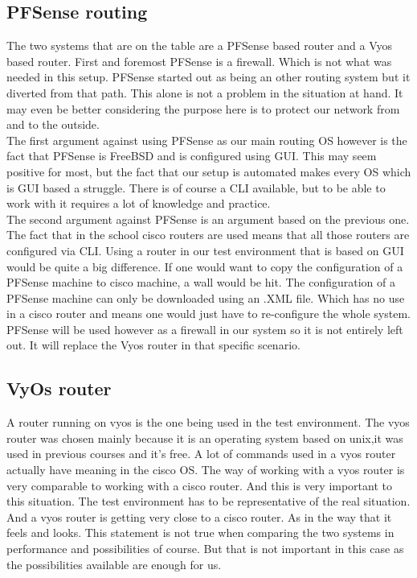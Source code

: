 \subsection { PFSense routing }
The two systems that are on the table are a PFSense based router and a Vyos based router. First and foremost PFSense is a firewall. Which is not what was needed in this setup. PFSense started out as being an other routing system but it diverted from that path. This alone is not a problem in the situation at hand. It may even be better considering the purpose here is to protect our network from and to the outside. \\
The first argument against using PFSense as our main routing OS however is the fact that PFSense is FreeBSD and is configured using GUI. This may seem positive for most, but the fact that our setup is automated makes every OS which is GUI based a struggle. There is of course a CLI available, but to be able to work with it requires a lot of knowledge and practice. \\
The second argument against PFSense is an argument based on the previous one. The fact that in the school cisco routers are used means that all those routers are configured via CLI. Using a router in our test environment that is based on GUI would be quite a big difference. If one would want to copy the configuration of a PFSense machine to cisco machine, a wall would be hit. The configuration of a PFSense machine can only be downloaded using an .XML file. Which has no use in a cisco router and means one would just have to re-configure the whole system. PFSense will be used however as a firewall in our system so it is not entirely left out. It will replace the Vyos router in that specific scenario.
\subsection { VyOs router }
A router running on vyos is the one being used in the test environment. The vyos router was chosen mainly because it is an operating system based on unix,it was used in previous courses  and it's free.
A lot of commands used in a vyos router actually have meaning in the cisco OS. The way of working with a vyos router is very comparable to working with a cisco router. And this is very important  to this situation. The test environment has to be representative of the real situation. And a vyos router is getting very close to a cisco router. As in the way that it feels and looks. This statement is not true when comparing the two systems in performance and possibilities of course. But that is not important in this case as the possibilities available are enough for us.



